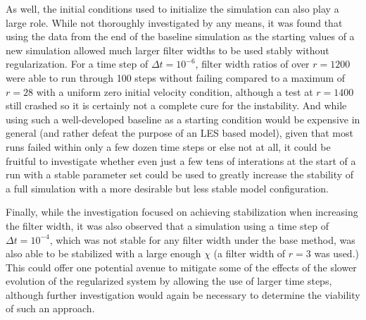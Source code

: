 As well, the initial conditions used to initialize the simulation can also play a large role. While not thoroughly investigated by any means, it was found that using the data from the end of the baseline simulation as the starting values of a new simulation allowed much larger filter widths to be used stably without regularization. For a time step of $\Delta t=10^{-6}$, filter width ratios of over $r=1200$ were able to run through 100 steps without failing compared to a maximum of $r=28$ with a uniform zero initial velocity condition, although a test at $r=1400$ still crashed so it is certainly not a complete cure for the instability. And while using such a well-developed baseline as a starting condition would be expensive in general (and rather defeat the purpose of an LES based model), given that most runs failed within only a few dozen time steps or else not at all, it could be fruitful to investigate whether even just a few tens of interations at the start of a run with a stable parameter set could be used to greatly increase the stability of a full simulation with a more desirable but less stable model configuration.

Finally, while the investigation focused on achieving stabilization when increasing the filter width, it was also observed that a simulation using a time step of $\Delta t=10^{-4}$, which was not stable for any filter width under the base method, was also able to be stabilized with a large enough $\chi$ (a filter width of $r=3$ was used.) This could offer one potential avenue to mitigate some of the effects of the slower evolution of the regularized system by allowing the use of larger time steps, although further investigation would again be necessary to determine the viability of such an approach.
